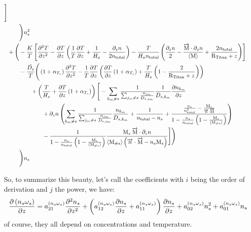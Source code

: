 \begin{landscape}
\begin{equation}
\begin{split}
                \Bigg]\\
& \qquad\Bigg)n_s^2\\
& + \Bigg( - \frac{K}{T} 
          \left[ \frac{\partial^2T}{\partial{z}^2} 
           - \frac{\partial T}{\partial z}\left(\frac{1}{T}\frac{\partial T}{\partial z} + \frac{1}{H_a} - \frac{\partial_{z}{n}}{2n_\text{total}}\right)
           - \frac{T}{H_an_\text{total}}
                             \left(
                                  \frac{\partial_{z}{n}}{2}
                                - \frac{\overrightarrow{\text{M}}\cdot\partial_{z}{n}}{\langle\text{M}\rangle}
                                + \frac{2n_\text{total}}{\text{R}_\text{Titan} + z} 
                            \right)
          \right]  \\
& \qquad - \frac{\tilde{D_s}}{T}
                \Bigg(
                        \left(1 + \alpha_{T_s}\right)\frac{\partial^2T}{\partial{z}^2} 
                      - \frac{1}{T}\frac{\partial T}{\partial z}\left(\frac{\partial T}{\partial z}\left(1 + \alpha_{T_s}\right)
                                         + \frac{T}{H_s}\left(1 - \frac{2}{\text{R}_\text{Titan} + z}\right)
                                   \right)
             \\
&\qquad\qquad + \left(\frac{T}{H_s} + \frac{\partial T}{\partial z}\left(1 + \alpha_{T_s}\right)\right)
\Bigg[ - \sum_{k_m\neq s}\frac{1}{\sum_{j_m \neq s}\frac{n_{j_m}}{D_{s,j_m}}}
                                \frac{1}{D_{s,k_m}} \frac{\partial n_{k_m}}{\partial z} \\
& \qquad\qquad\qquad + \partial_{z}{n}
                 \left(\sum_{k_m\neq s}\frac{1}{\sum_{j_m \neq s}\frac{n_{j_m}}{D_{s,j_m}}}\frac{n_{k_m}}{D_{s,k_m}}
                      + \frac{1}{n_\text{total} - n_s}
                      + \frac{\frac{n_s}{n_\text{total}^2} - \frac{\text{M}_s}{\overrightarrow{n}\cdot\overrightarrow{\text{M}}}}
                             {1-\frac{n_s}{n_\text{total}}\left(1 - \frac{\text{M}_s}{\langle\text{M}_{\neq s}\rangle}\right)}
                 \right) \\
&\qquad\qquad\qquad 
               - \frac{1}{1-\frac{n_s}{n_\text{total}}\left(1 - \frac{\text{M}_s}{\langle\text{M}_{\neq s}\rangle}\right)}
                           \frac{\text{M}_s\:\overrightarrow{\text{M}}\cdot\partial_{z}{n}}
                                 {\langle\text{M}_{\neq s}\rangle\left(\overrightarrow{n}\cdot\overrightarrow{\text{M}} - n_s\text{M}_s\right)}
\Bigg]
\Bigg)\\
& \qquad\Bigg)n_s
\end{split}
\label{Titan:diff_nw_deriv}
\end{equation}
\end{landscape}
So, to summarize this beauty, let's call the coefficients  with
$i$ being the order of derivation and $j$ the power, we have:
\begin{equation}
\frac{\partial\left(n_s\omega_s\right)}{\partial z} = a^{(n_s\omega_s)}_{21} \frac{\partial^2n_s}{\partial{z}^2}
                            + \left(a^{(n_s\omega_s)}_{12} \frac{\partial n_s}{\partial z} + a^{(n_s\omega_s)}_{11}\right)\frac{\partial n_s}{\partial z}
                            + a^{(n_s\omega_s)}_{02} n_s^2
                            + a^{(n_s\omega_s)}_{01} n_s
\label{Titan:diff_final_der}
\end{equation}
of course, they all depend on concentrations and temperature.
